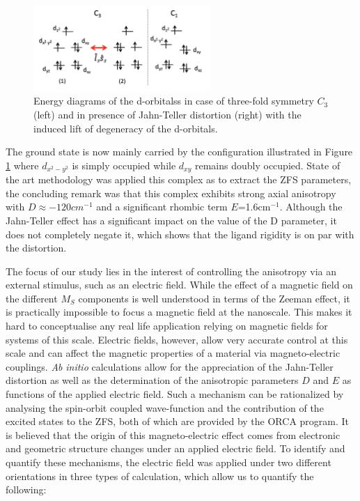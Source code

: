\documentclass[10pt]{report}
\numberwithin{equation}{section}
\begin{document}
\begin{figure}
    \centering
    \includegraphics[width=0.6\textwidth]{Images/NiMe6tren_config.png}
    \caption{Energy diagrams of the d-orbitalss in case of three-fold symmetry $C_3$ (left) and in presence of Jahn-Teller distortion (right) with the induced lift of degeneracy of the d-orbitals. }
    \label{NiMe6tren_config}
\end{figure}

The ground state is now mainly carried by the configuration illustrated in Figure \ref{NiMe6tren_config} where $d_{x^2-y^2}$ is simply occupied while $d_{xy}$ remains doubly occupied.
State of the art methodology was applied this complex as to extract the ZFS parameters, the concluding remark was that this complex exhibits strong axial anisotropy with $D\approx-120cm^{-1}$ and a significant rhombic term $E$=1.6cm$^{-1}$. 
Although the Jahn-Teller effect has a significant impact on the value of the D parameter, it does not completely negate it, which shows that the ligand rigidity is on par with the distortion.

\par The focus of our study lies in the interest of controlling the anisotropy via an external stimulus, such as an electric field.
While the effect of a magnetic field on the different $M_S$ components is well understood in terms of the Zeeman effect, it is practically impossible to focus a magnetic field at the nanoscale.
This makes it hard to conceptualise any real life application relying on magnetic fields for systems of this scale.
Electric fields, however, allow very accurate control at this scale and can affect the magnetic properties of a material via magneto-electric couplings.
\textit{Ab} \textit{initio} calculations allow for the appreciation of the Jahn-Teller distortion as well as the determination of the anisotropic parameters $D$ and $E$ as functions of the applied electric field.
Such a mechanism can be rationalized by analysing the spin-orbit coupled wave-function and the contribution of the excited states to the ZFS, both of which are provided by the ORCA program.
It is believed that the origin of this magneto-electric effect comes from electronic and geometric structure changes under an applied electric field. 
To identify and quantify these mechanisms, the electric field was applied under two different orientations in three types of calculation, which allow us to quantify the following:
\end{document}

